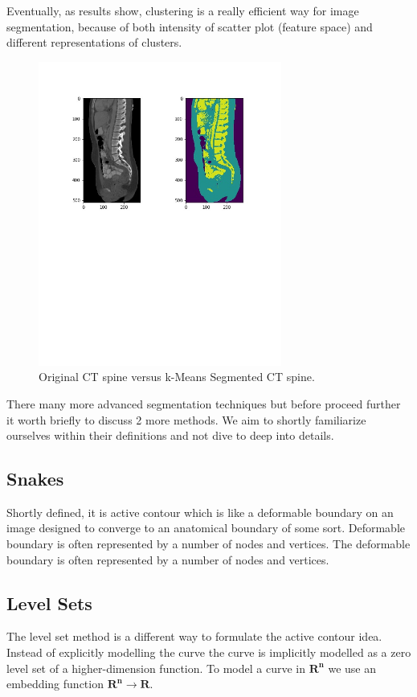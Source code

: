 Eventually, as results show, clustering is a really efficient way for image segmentation, because of both intensity of scatter plot (feature space) and different representations of clusters.

\newpage
\begin{figure}[h]
    \centering \includegraphics[width=8cm]{images/ct-spine-k-means-segmented.jpg}
    \vspace*{-50mm} \caption {Original CT spine versus k-Means Segmented CT spine.}
\end{figure}

There many more advanced segmentation techniques but before proceed further it worth briefly to discuss 2 more methods. We aim to shortly familiarize ourselves within their definitions and not dive to deep into details.      
\subsection{Snakes}
Shortly defined, it is active contour which is like a deformable boundary on an image designed to converge to an anatomical boundary of some sort. Deformable boundary is often represented by a number of nodes and vertices.  
The deformable boundary is often represented by a number of nodes and vertices.  

\subsection{Level Sets}
The level set method is a different way to formulate the active contour idea. Instead of explicitly modelling the curve the curve is implicitly modelled as a zero level set of a higher-dimension function. To model a curve in $\mathbf{R^n}$ we use an embedding function $\mathbf{R^n} \to \mathbf{R}$.     

